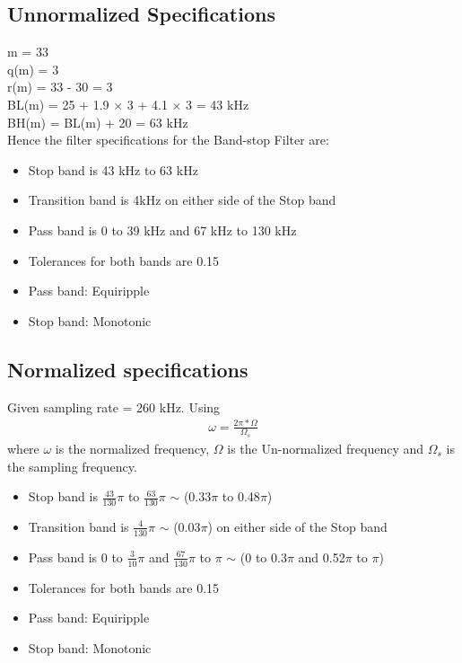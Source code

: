 \documentclass[12pt]{article}
\begin{document}
	\subsection{Unnormalized Specifications}
	\color{black}
	m = 33\\
	q(m) = 3\\
	r(m) = 33 - 30 = 3\\
	BL(m) = 25 + 1.9 $\times$ 3 + 4.1 $\times$ 3 = 43 kHz\\
	BH(m) = BL(m) + 20 = 63 kHz\\
	
	\noindent Hence the filter specifications for the Band-stop Filter are:
	\begin{itemize}
		\item Stop band is 43 kHz to 63 kHz
		\item Transition band is 4kHz on either side of the Stop band
		\item Pass band is 0 to 39 kHz and 67 kHz to 130 kHz
		\item Tolerances for both bands are 0.15
		\item Pass band: Equiripple
		\item Stop band: Monotonic 
	\end{itemize}
	
	\color{cyan}
	\subsection{Normalized specifications}
	\color{black}
	Given sampling rate  = 260 kHz. Using\\
	\begin{gather*}
		\omega = \frac{2\pi \ast \Omega}{\Omega_s}
	\end{gather*}
	where $\omega$ is the normalized frequency, $\Omega$ is the Un-normalized frequency and $\Omega_s$ is the sampling frequency.
	\begin{itemize}
		\item Stop band is $\frac{43}{130}\pi$ to $\frac{63}{130}\pi$ $\sim$ (0.33$\pi$ to 0.48$\pi$)
		\item Transition band is $\frac{4}{130}\pi$ $\sim$ (0.03$\pi$) on either side of the Stop band
		\item Pass band is 0 to  $\frac{3}{10}\pi$ and $\frac{67}{130}\pi$ to $\pi$  $\sim$ (0 to 0.3$\pi$ and  0.52$\pi$ to $\pi$)
		\item Tolerances for both bands are 0.15
		\item Pass band: Equiripple
		\item Stop band: Monotonic
	\end{itemize}
	
\end{document}
